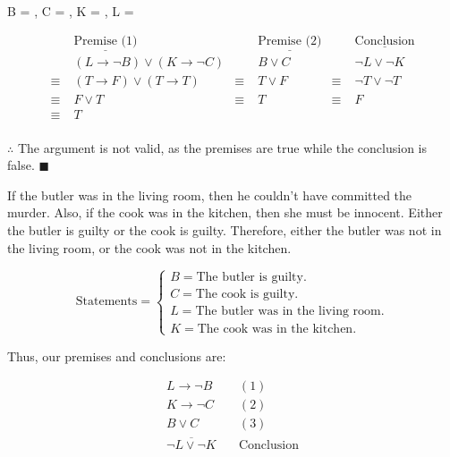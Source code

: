\documentclass[]{article}
\begin{document}
\begin{center}
      \\
    B = , C = , K = , L =  \\
\end{center}
\begin{align*}
    & \underline{\text{Premise (1)}} & & \underline{\text{Premise (2)}} & & \underline{\text{Conclusion}} \\
    & (L \rightarrow \neg B) \lor (K \rightarrow \neg C) & & B \lor C & & \neg L \lor \neg K \\
    \equiv\; & (T \rightarrow F) \lor (T \rightarrow T) & \equiv\; & T \lor F & \equiv\; & \neg T \lor \neg T \\
    \equiv\; & F \lor T & \equiv\; &  T & \equiv\; & F \\
    \equiv\; & T & & & & \\
\end{align*}
\begin{center}
    $\therefore$ The argument is not valid, as the premises are true while the conclusion is false. $\blacksquare$
\end{center}
\begin{question}
    If the butler was in the living room, then he couldn’t have committed the murder. Also, if the cook was in the
kitchen, then she must be innocent. Either the butler is guilty or the cook is guilty. Therefore, either the butler
was not in the living room, or the cook was not in the kitchen.
\end{question}

\[  
    \text{Statements} = 
    \begin{cases}
        B = \text{The butler is guilty.} \\
        C = \text{The cook is guilty.} \\
        L = \text{The butler was in the living room.} \\
        K = \text{The cook was in the kitchen.}
    \end{cases}
\]
\begin{center}
    Thus, our premises and conclusions are:
\end{center}

\begin{align*}
    L \rightarrow \neg B & \quad (1) \\
    K \rightarrow \neg C & \quad (2) \\
    B \lor C & \quad (3) \\
    \overline{\neg L \lor \neg K} & \quad \text{Conclusion}
\end{align*}
\end{document}
